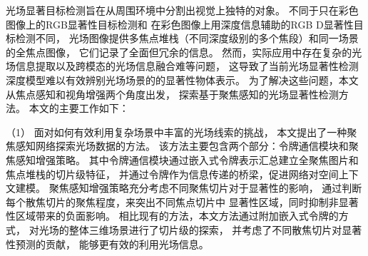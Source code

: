 





%
%
%
%
%
%
%






光场显著目标检测旨在从周围环境中分割出视觉上独特的对象。
不同于只在彩色图像上的RGB显著性目标检测和
在彩色图像上用深度信息辅助的RGB D显著性目标检测不同，
光场图像提供多焦点堆栈（不同深度级别的多个焦段）和同一场景的全焦点图像，
它们记录了全面但冗余的信息。
然而，实际应用中存在复杂的光场信息提取以及跨模态的光场信息融合难等问题，
这导致了当前光场显著性检测深度模型难以有效辨别光场场景的的显著性物体表示。
为了解决这些问题，本文从焦点感知和视角增强两个角度出发，
探索基于聚焦感知的光场显著性检测方法。
本文的主要工作如下：




%
%
（1）
%
%
面对如何有效利用复杂场景中丰富的光场线索的挑战，
本文提出了一种聚焦感知网络探索光场数据的方法。
%
%
该方法主要包含两个部分：令牌通信模块和聚焦感知增强策略。
%
%
其中令牌通信模块通过嵌入式令牌表示汇总建立全聚焦图片和焦点堆栈的切片级特征，
并通过令牌作为信息传递的桥梁，促进网络对空间上下文建模。
%
%
聚焦感知增强策略充分考虑不同聚焦切片对于显著性的影响，
通过判断每个散焦切片的聚焦程度，来突出不同焦点切片中
显著性区域，同时抑制非显著性区域带来的负面影响。
%
%
相比现有的方法，本文方法通过附加嵌入式令牌的方式，
对光场的整体三维场景进行了切片级的探索，
并考虑了不同散焦切片对显著性预测的贡献，
能够更有效的利用光场信息。

